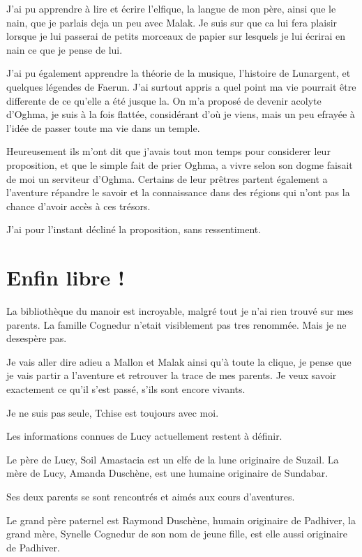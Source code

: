 \documentclass[10pt,a4paper,twoside,twocolumn,openany]{book}
\begin{document}
J'ai pu apprendre à lire et écrire l'elfique, la langue de mon père, ainsi que le nain, que je parlais
deja un peu avec Malak. Je suis sur que ca lui fera plaisir lorsque je lui passerai de petits morceaux
de papier sur lesquels je lui écrirai en nain ce que je pense de lui.

J'ai pu également apprendre la théorie de la musique, l'histoire de Lunargent, et quelques légendes
de Faerun.
J'ai surtout appris a quel point ma vie pourrait être differente de ce qu'elle a été
jusque la. On m'a proposé de devenir acolyte d'Oghma, je suis à la fois flattée, considérant
d'où je viens, mais un peu efrayée à l'idée de passer toute ma vie dans un temple.

Heureusement ils m'ont dit que j'avais tout mon temps pour considerer leur proposition, et que le
simple fait de prier Oghma, a vivre selon son dogme faisait de moi un serviteur 
d'Oghma. Certains de leur prêtres partent également a l'aventure répandre le savoir et la connaissance
dans des régions qui n'ont pas la chance d'avoir accès à ces trésors.

J'ai pour l'instant décliné la proposition, sans ressentiment.

\section{Enfin libre !}

La bibliothèque du manoir est incroyable, malgré tout je n'ai rien trouvé sur mes parents. 
La famille Cognedur n'etait visiblement pas tres renommée. Mais je ne desespère pas.

Je vais aller dire adieu a Mallon et Malak ainsi qu'à toute la clique, je pense que je
vais partir a l'aventure et retrouver la trace de mes parents. Je veux savoir exactement
ce qu'il s'est passé, s'ils sont encore vivants.

Je ne suis pas seule, Tchise est toujours avec moi.

\begin{quotebox}
Les informations connues de Lucy actuellement restent à définir.

Le père de Lucy, Soil Amastacia est un elfe de la lune originaire de Suzail.
La mère de Lucy, Amanda Duschène, est une humaine originaire de Sundabar.

Ses deux parents se sont rencontrés et aimés aux cours d'aventures.

Le grand père paternel est Raymond Duschène, humain originaire de Padhiver, 
la grand mère, Synelle Cognedur de son nom de jeune fille, est elle aussi
originaire de Padhiver.
\end{quotebox}
\end{document}
